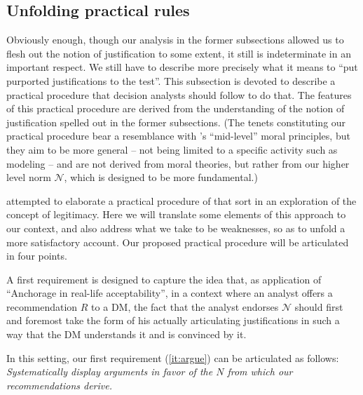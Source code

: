 \documentclass[preprint, french, english, 11pt, authoryear]{elsarticle}%
\newcommand{\ac}[1]{#1}
\newcommand{\adv}{\mathscr{N}}
\begin{document}
\subsection{Unfolding practical rules}
Obviously enough, though our analysis in the former subsections allowed us to flesh out the notion of justification to some extent, it still is indeterminate in an important respect. 
We still have to describe more precisely what it means to ``put purported justifications to the test''. This subsection is devoted to describe a practical procedure that decision analysts should follow to do that. 
The features of this practical procedure are derived from the understanding of the notion of justification spelled out in the former subsections. 
(The tenets constituting our practical procedure bear a resemblance with \citeauthor{diekmann_moral_2013}’s \citeyearpar{diekmann_moral_2013} ``mid-level'' moral principles, but they aim to be more general -- not being limited to a specific activity such as modeling -- 
and are not derived from moral theories, but rather from our higher level norm $\mathscr{N}$, which is designed to be more fundamental.)

\citet{meinard_what_2017} attempted to elaborate a practical procedure of that sort in an exploration of the concept of legitimacy. Here we will translate some elements of this approach to our context, and also address what we take to be weaknesses, so as to unfold a more satisfactory account. 
Our proposed practical procedure will be articulated in four points.

\begin{changebar}
A first requirement is designed to capture the idea that, as application of “Anchorage in real-life acceptability”, in a context where an analyst offers a recommendation $R$ to a \ac{DM}, 
the fact that the analyst endorses $\adv$ should first and foremost take the form of his actually articulating justifications in such a way that the \ac{DM} understands it and is convinced by it.
\end{changebar}

In this setting, our first requirement (\cref{it:argue}) can be articulated as follows: \emph{Systematically display arguments in favor of the $N$ from which our recommendations derive.}
\end{document}
